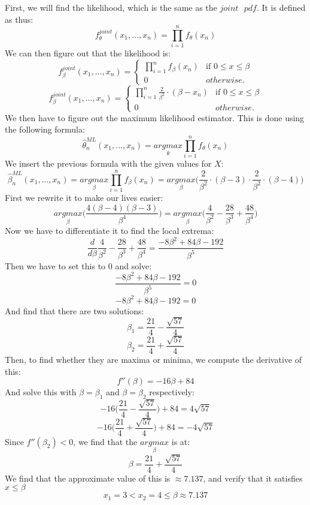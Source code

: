First, we will find the likelihood, which is the same as the $joint \text{ }pdf$. It is defined as thus:
$$
f_{\theta}^{joint}(x_1,...,x_n) = \prod_{i = 1}^n f_\theta(x_n)
$$
We can then figure out that the likelihood is:
$$
f_{\beta}^{joint}(x_1,...,x_n) = 
\left\{
\begin{matrix}
\prod_{i = 1}^n f_\beta(x_n) & \text{if }0 \leq x \leq \beta \\
0 & otherwise.
\end{matrix}
\right.
$$
$$
f_{\beta}^{joint}(x_1,...,x_n) = 
\left\{
\begin{matrix}
\prod_{i = 1}^n \frac{2}{\beta^2} \cdot (\beta - x_n) & \text{if }0 \leq x \leq \beta \\
0 & otherwise.
\end{matrix}
\right.
$$
We then have to figure out the maximum likelihood estimator. This is done using the following formula:
$$
\hat\theta_n^{ML}(x_1,...,x_n) = \underset{\theta}{argmax}\prod_{i=1}^n f_\theta(x_n)
$$
We insert the previous formula with the given values for $X$:
$$
\hat\beta_n^{ML}(x_1,...,x_n) = \underset{\beta}{argmax}\prod_{i=1}^n f_\beta(x_n) = \underset{\beta}{argmax}\Bigg(\frac{2}{\beta^2} \cdot (\beta - 3) \cdot \frac{2}{\beta^2} \cdot (\beta - 4)\Bigg)
$$
First we rewrite it to make our lives easier:
$$
\underset{\beta}{argmax}\Bigg(\frac{4(\beta-4)(\beta-3)}{\beta^4}\Bigg) = \underset{\beta}{argmax}\Bigg(\frac{4}{\beta^2}-\frac{28}{\beta^3}+\frac{48}{\beta^4}\Bigg)
$$
Now we have to differentiate it to find the local extrema:
$$
\frac{d}{d\beta} \frac{4}{\beta^2}-\frac{28}{\beta^3}+\frac{48}{\beta^4} = \frac{-8\beta^2+84\beta-192}{\beta^5}
$$
Then we have to set this to $0$ and solve:
$$
\frac{-8\beta^2+84\beta-192}{\beta^5} = 0
$$
$$
-8\beta^2+84\beta-192 = 0
$$
And find that there are two solutions:
$$
\beta_1 = \frac{21}{4}-\frac{\sqrt{57}}{4}
$$
$$
\beta_2 = \frac{21}{4}+\frac{\sqrt{57}}{4}
$$
Then, to find whether they are maxima or minima, we compute the derivative of this:
$$
f''(\beta)=-16\beta+84
$$
And solve this with $\beta = \beta_1$ and $\beta = \beta_2$ respectively:
$$
-16\Bigg(\frac{21}{4}-\frac{\sqrt{57}}{4}\Bigg) + 84 = 4\sqrt{57}
$$
$$
-16\Bigg(\frac{21}{4}+\frac{\sqrt{57}}{4}\Bigg) + 84 = -4\sqrt{57}
$$
Since $f''(\beta_2) < 0$, we find that the $\underset{\beta}{argmax}$ is at:
$$
\beta = \frac{21}{4}+\frac{\sqrt{57}}{4}
$$
We find that the approximate value of this is $\approx 7.137$, and verify that it satisfies $x \leq \beta$
$$
x_1 = 3 < x_2 = 4 \leq \beta \approx 7.137
$$